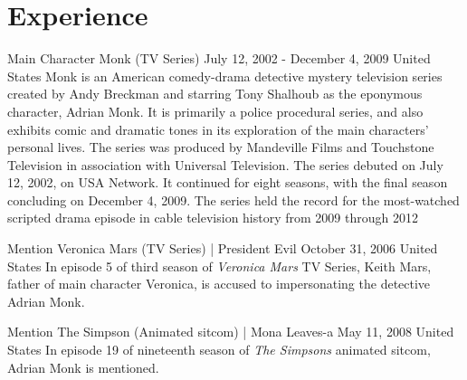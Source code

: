 \documentclass[]{mcec-cv-01}
\begin{document}

\section{Experience}
\nopagebreak
\begin{mcecllist}
\litem
{Main Character}
{Monk (TV Series)}
{July 12, 2002 - December 4, 2009}
{United States}
{Monk is an American comedy-drama detective mystery television series created by Andy Breckman and starring Tony Shalhoub as the eponymous character, Adrian Monk. It is primarily a police procedural series, and also exhibits comic and dramatic tones in its exploration of the main characters' personal lives. The series was produced by Mandeville Films and Touchstone Television in association with Universal Television. The series debuted on July 12, 2002, on USA Network. It continued for eight seasons, with the final season concluding on December 4, 2009. The series held the record for the most-watched scripted drama episode in cable television history from 2009 through 2012}

\litem
{Mention}
{Veronica Mars (TV Series) | President Evil}
{October 31, 2006}
{United States}
{In episode 5 of third season of \emph{Veronica Mars} TV Series, Keith Mars, father of main character Veronica, is accused to impersonating the detective Adrian Monk.}

\litem
{Mention}
{The Simpson (Animated sitcom) | Mona Leaves-a}
{May 11, 2008}
{United States}
{In episode 19 of nineteenth season of \emph{The Simpsons} animated sitcom, Adrian Monk is mentioned.}

\end{mcecllist}
\end{document}

